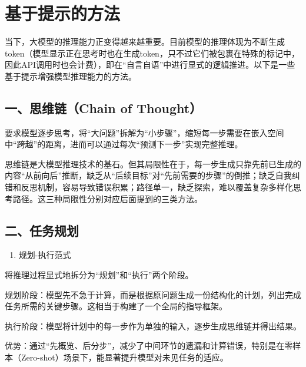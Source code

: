 \setcounter{section}{0}

\hypertarget{ux57faux4e8eux63d0ux793aux7684ux65b9ux6cd5}{%
\section{基于提示的方法}\label{ux57faux4e8eux63d0ux793aux7684ux65b9ux6cd5}}

当下，大模型的推理能力正变得越来越重要。目前模型的推理体现为不断生成token（模型显示正在思考时也在生成token，只不过它们被包裹在特殊的标记中，因此API调用时也会计费），即在``自言自语''中进行显式的逻辑推进。以下是一些基于提示增强模型推理能力的方法。

\hypertarget{ux4e00ux601dux7ef4ux94fechain-of-thought}{%
\subsection{一、思维链（Chain of Thought）}\label{ux4e00ux601dux7ef4ux94fechain-of-thought}}

要求模型逐步思考，将``大问题''拆解为``小步骤''，缩短每一步需要在嵌入空间中``跨越''的距离，进而可以通过每次``预测下一步''实现完整推理。

思维链是大模型推理技术的基石。但其局限性在于，每一步生成只靠先前已生成的内容``从前向后''推断，缺乏从``后续目标''对``先前需要的步骤''的倒推；缺乏自我纠错和反思机制，容易导致错误积累；路径单一，缺乏探索，难以覆盖复杂多样化思考路径。这三种局限性分别对应后面提到的三类方法。

\hypertarget{ux4e8cux4efbux52a1ux89c4ux5212}{%
\subsection{二、任务规划}\label{ux4e8cux4efbux52a1ux89c4ux5212}}

\begin{enumerate}
\def\labelenumi{\arabic{enumi}.}
\tightlist
\item
  规划-执行范式
\end{enumerate}

将推理过程显式地拆分为``规划''和``执行''两个阶段。

规划阶段：模型先不急于计算，而是根据原问题生成一份结构化的计划，列出完成任务所需的关键步骤。这相当于构建了一个全局的指导框架。

执行阶段：模型将计划中的每一步作为单独的输入，逐步生成思维链并得出结果。

优势：通过``先概览、后分步''，减少了中间环节的遗漏和计算错误，特别是在零样本（Zero-shot）场景下，能显著提升模型对未见任务的适应。

